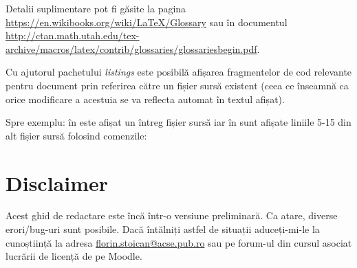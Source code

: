 \begin{description}[style=nextline]
Detalii suplimentare pot fi găsite la pagina \url{https://en.wikibooks.org/wiki/LaTeX/Glossary} sau în documentul \url{http://ctan.math.utah.edu/tex-archive/macros/latex/contrib/glossaries/glossariesbegin.pdf}.

\item[fragmente de cod] 
Cu ajutorul pachetului \emph{listings} este posibilă afișarea fragmentelor de cod relevante pentru document prin referirea către un fișier sursă existent (ceea ce înseamnă ca orice modificare a acestuia se va reflecta automat în textul afișat).

Spre exemplu:  în  este afișat un întreg fișier sursă iar în  sunt afișate liniile 5-15 din alt fișier sursă folosind comenzile:

%

\end{description}


\section*{Disclaimer}

Acest ghid de redactare este încă într-o versiune preliminară. Ca atare, diverse erori/bug-uri sunt posibile. Dacă întălniți astfel de situații aduceți-mi-le la cunoștiință la adresa \href{mailto:florin.stoican@acse.pub.ro}{florin.stoican@acse.pub.ro} sau pe forum-ul din cursul asociat lucrării de licență de pe Moodle.